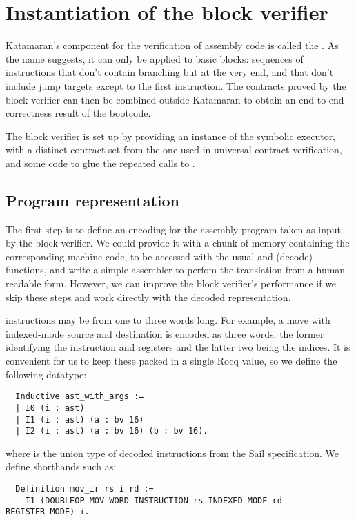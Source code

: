 \section{Instantiation of the block verifier}

Katamaran's component for the verification of assembly code is called the . As the name suggests, it can only be applied to basic blocks: sequences of instructions that don't contain branching but at the very end, and that don't include jump targets except to the first instruction. The contracts proved by the block verifier can then be combined outside Katamaran to obtain an end-to-end correctness result of the bootcode.

The block verifier is set up by providing an instance of the symbolic executor,
with a distinct contract set from the one used in universal contract verification, and some code to glue the repeated calls to .

\subsection{Program representation}
\label{sec:program-representation}

The first step is to define an encoding for the assembly program taken as input by the block verifier. We could provide it with a chunk of memory containing the corresponding machine code, to be accessed with the usual  and  (decode) functions, and write a simple assembler to perfom the translation from a human-readable form. However, we can improve the block verifier's performance if we skip these steps and work directly with the decoded representation.

\msp instructions may be from one to three words long. For example, a move with indexed-mode source and destination is encoded as three words, the former identifying the instruction and registers and the latter two being the indices. It is convenient for us to keep these packed in a single Rocq value, so we define the following datatype:
\begin{verbatim}
  Inductive ast_with_args :=
  | I0 (i : ast)
  | I1 (i : ast) (a : bv 16)
  | I2 (i : ast) (a : bv 16) (b : bv 16).
\end{verbatim}
where  is the union type of decoded instructions from the Sail specification. We define shorthands such as:
\begin{verbatim}
  Definition mov_ir rs i rd :=
    I1 (DOUBLEOP MOV WORD_INSTRUCTION rs INDEXED_MODE rd REGISTER_MODE) i.
\end{verbatim}

